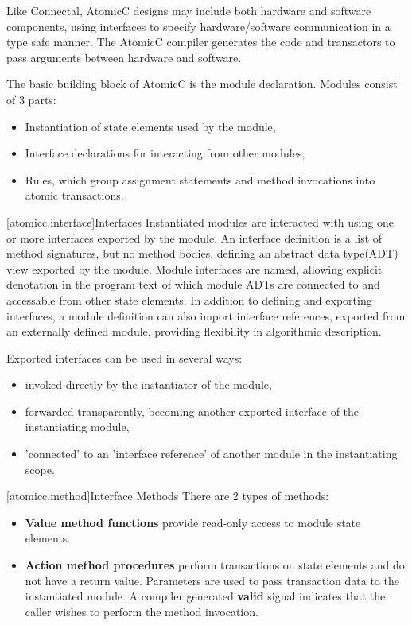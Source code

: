 Like Connectal, AtomicC designs may include both hardware and
software components, using interfaces to specify hardware/software communication
in a type safe manner. The AtomicC compiler generates the code and transactors to pass
arguments between hardware and software.

The basic building block of AtomicC is the module declaration.
Modules consist of 3 parts:
\begin{itemize}
\item Instantiation of state elements used by the module,
\item Interface declarations for interacting from other modules,
\item Rules, which group assignment statements and method invocations into atomic transactions.
\end{itemize}

[atomicc.interface]{Interfaces}
Instantiated modules are interacted with using one or more interfaces exported by the module.
An interface definition is a list of method signatures, but no method bodies, defining
an abstract data type(ADT) \cite{Liskov74programmingwith} view exported by the module.
Module interfaces are named, 
allowing explicit denotation in the program text
of which module ADTs are connected to and accessable from other state elements.
In addition to defining and exporting interfaces,
a module definition can also import
interface references, exported from an
externally defined module, providing flexibility in algorithmic description.

Exported interfaces can be used in several ways:
\begin{itemize}
\item invoked directly by the instantiator of the module,
\item forwarded transparently, becoming another exported interface of the instantiating module,
\item 'connected' to an 'interface reference' of another module in the instantiating scope.
\end{itemize}

[atomicc.method]{Interface Methods}
There are 2 types of methods:
\begin{itemize}
\item \textbf{Value method functions} provide read-only access to module state elements.
\item \textbf{Action method procedures} perform transactions on state elements
and do not have a return value.
Parameters are used to pass transaction data to the instantiated module.
A compiler generated
\textbf{valid} signal indicates that the caller wishes to perform the method invocation.
\end{itemize}

